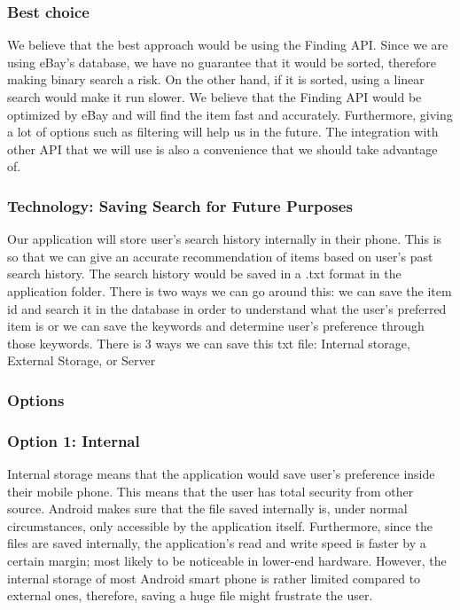\documentclass[journal,compsoc, 10pt, draftclsnofoot, onecolumn]{IEEEtran}
\begin{document}
\subsubsection*{Best choice}
We believe that the best approach would be using the Finding API. Since we are using
eBay's database, we have no guarantee that it would be sorted, therefore making
binary search a risk. On the other hand, if it is sorted, using a linear search would
make it run slower. We believe that the Finding API would be optimized by eBay and
will find the item fast and accurately. Furthermore, giving a lot of options such as
filtering will help us in the future. The integration with other API that we will use
is also a convenience that we should take advantage of.
  
\subsubsection{Technology: Saving Search for Future Purposes}
Our application will store user's search history internally in their phone. This is
so that we can give an accurate recommendation of items based on user's past search
history. The search history would be saved in a .txt format in the application
folder. There is two ways we can go around this: we can save the item id and search
it in the database in order to understand what the user's preferred item is or we can
save the keywords and determine user's preference through those keywords.
There is 3 ways we can save this txt file: Internal storage, External Storage, or
Server

\subsubsection*{Options}
\subsubsection*{Option 1: Internal}
Internal storage means that the application would save user's preference inside their
mobile phone. This means that the user has total security from other source. Android
makes sure that the file saved internally is, under normal circumstances, only
accessible by the application itself. Furthermore, since the files are saved
internally, the application's read and write speed is faster by a certain margin;
most likely to be noticeable in lower-end hardware. However, the internal storage of
most Android smart phone is rather limited compared to external ones, therefore,
saving a huge file might frustrate the user.
\end{document}

